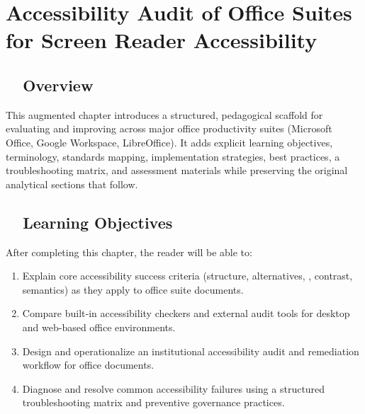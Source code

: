 \chapter{Accessibility Audit of Office Suites for Screen Reader Accessibility}

\section{~~Overview}\label{ch20:sec:overview}
This augmented chapter introduces a structured, pedagogical scaffold for evaluating and improving   across major office productivity suites (Microsoft Office, Google Workspace, LibreOffice). It adds explicit learning objectives, terminology, standards mapping, implementation strategies, best practices, a troubleshooting matrix, and assessment materials while preserving the original analytical sections that follow.

\section{~~Learning Objectives}\label{ch20:sec:learning-objectives}
After completing this chapter, the reader will be able to:
\begin{enumerate}
	\item Explain core accessibility success criteria (structure, alternatives, , contrast, semantics) as they apply to office suite documents.
	\item Compare built‑in accessibility checkers and external audit tools for desktop and web-based office environments.
	\item Design and operationalize an institutional accessibility audit and remediation workflow for office documents.
	\item Diagnose and resolve common accessibility failures using a structured troubleshooting matrix and preventive governance practices.
\end{enumerate}

